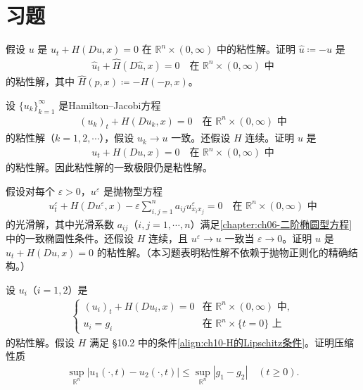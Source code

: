 \documentclass[../../main.tex]{subfiles}
\begin{document}
\section{习题}\label{section:ch10-习题}

\begin{exercise}\label{exercise:ch10-对偶粘性解}
假设 $u$ 是 $u_t+H(Du,x)=0$ 在 $\mathbb{R}^n\times(0,\infty)$ 中的粘性解。证明 $\widehat{u}\coloneqq-u$ 是
\begin{align*}
\widehat{u}_t+\widehat{H}(D\widehat{u},x)=0 \quad \text{在 } \mathbb{R}^n\times(0,\infty) \text{ 中}
\end{align*}
的粘性解，其中 $\widehat{H}(p,x)\coloneqq-H(-p,x)$。
\end{exercise}

\begin{exercise}\label{exercise:ch10-一致极限}
设 $\{u_k\}_{k=1}^\infty$ 是Hamilton--Jacobi方程
\begin{align*}
(u_k)_t+H(Du_k,x)=0 \quad \text{在 } \mathbb{R}^n\times(0,\infty) \text{ 中}
\end{align*}
的粘性解（$k=1,2,\cdots$），假设 $u_k\to u$ 一致。还假设 $H$ 连续。证明 $u$ 是
\begin{align*}
u_t+H(Du,x)=0 \quad \text{在 } \mathbb{R}^n\times(0,\infty) \text{ 中}
\end{align*}
的粘性解。因此粘性解的一致极限仍是粘性解。
\end{exercise}

\begin{exercise}\label{exercise:ch10-抛物正则化无关}
假设对每个 $\varepsilon>0$，$u^\varepsilon$ 是抛物型方程
\begin{align*}
u_t^\varepsilon+H(Du^\varepsilon,x)-\varepsilon\sum_{i,j=1}^n a_{ij}u_{x_i x_j}^\varepsilon=0 \quad \text{在 } \mathbb{R}^n\times(0,\infty) \text{ 中}
\end{align*}
的光滑解，其中光滑系数 $a_{ij}$（$i,j=1,\cdots,n$）满足\cref{chapter:ch06-二阶椭圆型方程}中的一致椭圆性条件。还假设 $H$ 连续，且 $u^\varepsilon\to u$ 一致当 $\varepsilon\to 0$。证明 $u$ 是 $u_t+H(Du,x)=0$ 的粘性解。（本习题表明粘性解不依赖于抛物正则化的精确结构。）
\end{exercise}

\begin{exercise}\label{exercise:ch10-压缩性质}
设 $u_i$（$i=1,2$）是
\begin{align*}
\begin{cases}
(u_i)_t+H(Du_i,x)=0 & \text{在 } \mathbb{R}^n\times(0,\infty) \text{ 中},\\
u_i=g_i & \text{在 } \mathbb{R}^n\times\{t=0\} \text{ 上}
\end{cases}
\end{align*}
的粘性解。假设 $H$ 满足 \S10.2 中的条件\eqref{align:ch10-H的Lipschitz条件}。证明压缩性质
\begin{align*}
\sup_{\mathbb{R}^n}|u_1(\cdot,t)-u_2(\cdot,t)|\leqslant\sup_{\mathbb{R}^n}|g_1-g_2| \quad (t\geqslant 0).
\end{align*}
\end{exercise}
\end{document}
